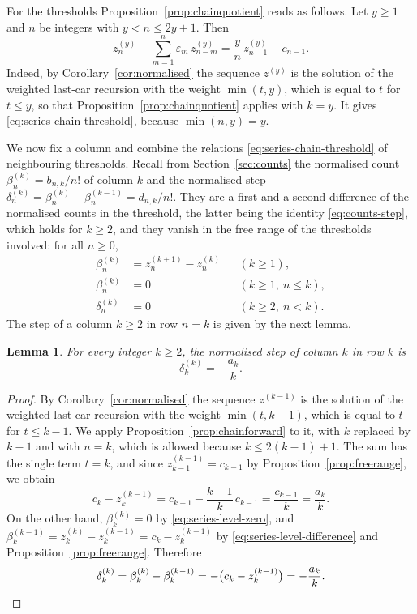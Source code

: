 \documentclass{amsart}
\makeatletter
\newtheorem{lemma}[theorem]{Lemma}
\theoremstyle{definition}
\theoremstyle{remark}
\numberwithin{equation}{section}
\def\subsection{\@startsection{subsection}{2}\z@{.5\linespacing\@plus.7\linespacing}{-.5em}{\normalfont\bfseries\boldmath}}
\makeatother
\begin{document}
For the thresholds Proposition~\ref{prop:chainquotient} reads as follows. Let
$y\ge1$ and $n$ be integers with $y<n\le2y+1$. Then
\begin{equation}\label{eq:series-chain-threshold}
z^{(y)}_n-\sum_{m=1}^{n}\varepsilon_m\,z^{(y)}_{n-m}
=\frac yn\,z^{(y)}_{n-1}-c_{n-1} .
\end{equation}
Indeed, by Corollary~\ref{cor:normalised} the sequence $z^{(y)}$ is the
solution of the weighted last-car recursion with the weight $\min(t,y)$, which
is equal to $t$ for $t\le y$, so that Proposition~\ref{prop:chainquotient}
applies with $k=y$. It gives \eqref{eq:series-chain-threshold}, because
$\min(n,y)=y$.

\subsection{The column equations}\label{subsec:series-column}

We now fix a column and combine the relations
\eqref{eq:series-chain-threshold} of neighbouring thresholds. Recall from
Section~\ref{sec:counts} the normalised count $\beta^{(k)}_n=b_{n,k}/n!$ of
column $k$ and the normalised step
$\delta^{(k)}_n=\beta^{(k)}_n-\beta^{(k-1)}_n=d_{n,k}/n!$. They are a first
and a second difference of the normalised counts in the threshold, the
latter being the identity \eqref{eq:counts-step}, which holds for $k\ge2$,
and they vanish in the free
range of the thresholds involved: for all $n\ge0$,
\begin{align}
\beta^{(k)}_n&=z^{(k+1)}_n-z^{(k)}_n&&(k\ge1),
\label{eq:series-level-difference}\\
\beta^{(k)}_n&=0&&(k\ge1,\ n\le k),
\label{eq:series-level-zero}\\
\delta^{(k)}_n&=0&&(k\ge2,\ n<k).
\label{eq:series-step-zero}
\end{align}
The step of a column $k\ge2$ in row $n=k$ is given by the next lemma.

\begin{lemma}\label{lem:initialstep}
For every integer $k\ge2$, the normalised step of column $k$ in row $k$ is
\[
\delta^{(k)}_k=-\frac{a_k}{k} .
\]
\end{lemma}

\begin{proof}
By Corollary~\ref{cor:normalised} the sequence $z^{(k-1)}$ is the solution of
the weighted last-car recursion with the weight $\min(t,k-1)$, which is equal
to $t$ for $t\le k-1$. We apply Proposition~\ref{prop:chainforward} to it,
with $k$ replaced by $k-1$ and with $n=k$, which is allowed because
$k\le2(k-1)+1$. The sum has the single term $t=k$, and since
$z^{(k-1)}_{k-1}=c_{k-1}$ by Proposition~\ref{prop:freerange}, we obtain
\[
c_k-z^{(k-1)}_k=c_{k-1}-\frac{k-1}{k}\,c_{k-1}=\frac{c_{k-1}}{k}
=\frac{a_k}{k} .
\]
On the other hand, $\beta^{(k)}_k=0$ by
\eqref{eq:series-level-zero}, and
$\beta^{(k-1)}_k=z^{(k)}_k-z^{(k-1)}_k=c_k-z^{(k-1)}_k$ by
\eqref{eq:series-level-difference} and Proposition~\ref{prop:freerange}.
Therefore
\[
\delta^{(k)}_k=\beta^{(k)}_k-\beta^{(k-1)}_k
=-\bigl(c_k-z^{(k-1)}_k\bigr)=-\frac{a_k}{k}. \qedhere
\]
\end{proof}
\end{document}
